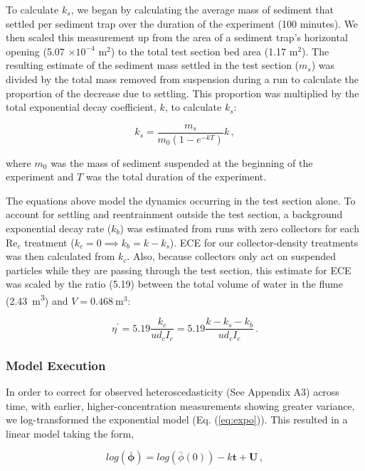 \documentclass[geosciences,article,submit,moreauthors,pdftex]{Definitions/mdpi}
\newcommand\Rey{\mathrm{Re}}
\begin{document}
To calculate $k_s$, we began by calculating the average mass of sediment that settled per sediment trap over the duration of the experiment (100 minutes). We then scaled this measurement up from the area of a sediment trap's horizontal opening (5.07 $\times 10^{-4}$ m$^2$) to the total test section bed area (1.17 m$^2$). The resulting estimate of the sediment mass settled in the test section ($m_s$) was divided by the total mass removed from suspension during a run to calculate the proportion of the decrease due to settling. This proportion was multiplied by the total exponential decay coefficient, $k$, to calculate $k_s$:

\begin{equation}
    k_s = \frac{m_s}{m_0(1-e^{-kT})}k\,,
    \label{eq:ks}
\end{equation}

\noindent where $m_0$ was the mass of sediment suspended at the beginning of the experiment and $T$ was the total duration of the experiment.

The equations above model the dynamics occurring in the test section alone. To account for settling and reentrainment outside the test section, a background exponential decay rate ($k_b$) was estimated from runs with zero collectors for each $\Rey_c$ treatment ($k_c = 0 \implies k_b = k - k_s$). ECE for our collector-density treatments was then calculated from $k_c$. Also, because collectors only act on suspended particles while they are passing through the test section, this estimate for ECE was scaled by the ratio (5.19) between the total volume of water in the flume (\SI{2.43}{\metre\cubed}) and $V = \SI{0.468}{\metre\cubed}$:

\begin{equation}
    \eta^\prime = 5.19\frac{k_c}{ud_cI_c} = 5.19\frac{k - k_s - k_b}{ud_cI_c}\,.
    \label{eq:eta}
\end{equation}

\subsubsection{Model Execution}

In order to correct for observed heteroscedasticity (See Appendix A3) across time, with earlier, higher-concentration measurements showing greater variance, we log-transformed the exponential model (Eq. (\ref{eq:expo})). This resulted in a linear model taking the form,

\begin{equation}
    log(\boldsymbol{\bar{\phi}}) = log(\bar{\phi}(0)) - k\boldsymbol{t} + \boldsymbol{U} \,,
\end{equation}
\end{document}
